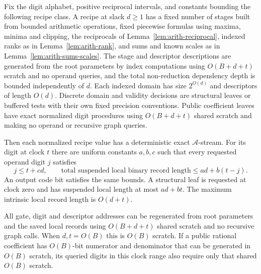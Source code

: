 \begin{theorem}
\label{thm:arith-interface}
Fix the digit alphabet, positive reciprocal intervals, and
constants bounding the following recipe class.  A recipe at
slack $d\geq1$ has a fixed number of stages built from bounded
arithmetic operations, fixed piecewise formulas using maxima,
minima and clipping, the reciprocals of
Lemma~\ref{lem:arith-reciprocal}, indexed ranks as in
Lemma~\ref{lem:arith-rank}, and sums and known scales as in
Lemma~\ref{lem:arith-sums-scales}.  The stage and descriptor
descriptions are generated from the root parameters by index
computations using $O(B+d+t)$ scratch and no operand queries, and the
total non-reduction dependency depth is bounded independently
of $d$.  Each indexed domain has size $2^{O(d)}$ and descriptors
of length $O(d)$.  Discrete domain and validity decisions are
structural leaves or buffered tests with their own fixed
precision conventions.  Public coefficient leaves have exact
normalized digit procedures using $O(B+d+t)$ shared scratch
and making no operand or recursive graph queries.

Then each normalized recipe value has a deterministic exact
$\mathcal A$-stream.  For its digit at clock $t$ there are uniform
constants $a,b,c$ such that every requested operand digit $j$
satisfies
\begin{equation}
 j\leq t+cd,\qquad
 \text{total suspended local binary record length}
       \leq ad+b(t-j).
 \label{eq:arith-export}
\end{equation}
An output code bit satisfies the same bounds.  A structural leaf
is requested at clock zero and has suspended local length at
most $ad+bt$.  The maximum intrinsic local record length is
$O(d+t)$.

All gate, digit and descriptor addresses can be regenerated from
root parameters and the saved local records using
$O(B+d+t)$ shared scratch and no recursive graph calls.  When
$d,t=O(B)$ this is $O(B)$ scratch.  If a public rational
coefficient has $O(B)$-bit numerator and denominator that can
be generated in $O(B)$ scratch, its queried digits in this clock
range also require only that shared $O(B)$ scratch.
\end{theorem}


